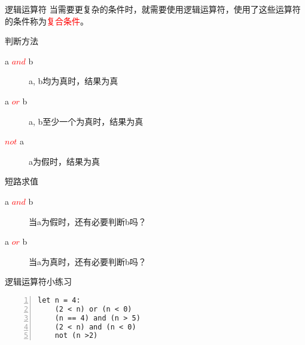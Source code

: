 \documentclass{beamer}
\begin{document}
\begin{frame}[fragile]{逻辑运算符}
当需要更复杂的条件时，就需要使用逻辑运算符，使用了这些运算符的条件称为\textcolor{red}{复合条件}。
\begin{block}{判断方法}
\begin{description}
\item[ a \textcolor{red}{$and$} b ]  a, b均为真时，结果为真
\item[ a \textcolor{red}{$or$} b ]  a, b至少一个为真时，结果为真
\item[ \textcolor{red}{$not$} a ]  a为假时，结果为真
\end{description}
\end{block}
\begin{block}{短路求值}
\begin{description}
\item[ a \textcolor{red}{$and$} b ]  当a为假时，还有必要判断b吗？
\item[ a \textcolor{red}{$or$} b ]  当a为真时，还有必要判断b吗？
\end{description}
\end{block}

\end{frame}

\begin{frame}[fragile]{逻辑运算符小练习}


\begin{block}{}
\begin{Verbatim}[numbers=left,frame=single,rulecolor=\color{red}]
let n = 4:
    (2 < n) or (n < 0)
    (n == 4) and (n > 5)
    (2 < n) and (n < 0)
    not (n >2)
\end{Verbatim}
\end{block}

\end{frame}
\end{document}
